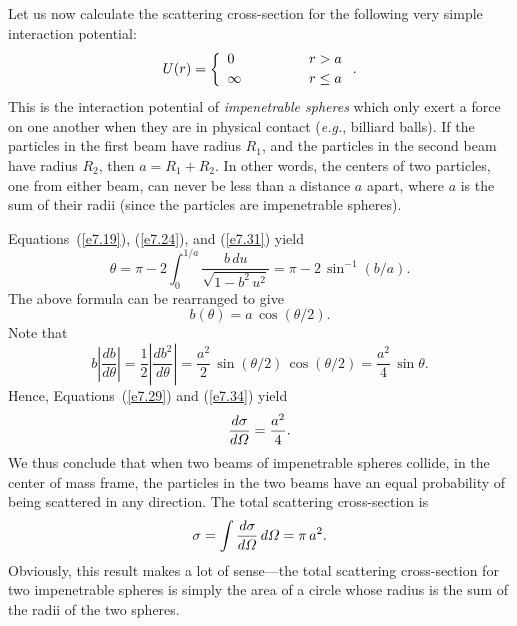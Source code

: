 Let us now calculate the scattering cross-section for the following
very simple interaction potential:
\begin{equation}
U(r) = 
\left\{\begin{array}{lll}
0&\mbox{\hspace{1cm}} & r>a\\[0.5ex]
\infty && r\leq a
\end{array}\right..\label{e7.31}
\end{equation}
This is the interaction potential of {\em impenetrable spheres}\/ which only
exert a force on one another when they are in physical contact 
({\em e.g.}, billiard balls). If the particles in the first beam have
radius $R_1$, and the particles in the second beam have radius $R_2$,
then $a=R_1+R_2$. In other words, the centers of two particles, one from either
beam, can never be less than a distance $a$ apart, where
$a$ is the sum of their radii (since the particles
are impenetrable spheres). 

Equations~(\ref{e7.19}), (\ref{e7.24}), and (\ref{e7.31})
yield
\begin{equation}
\theta = \pi - 2\int_0^{1/a}\frac{b\,du}{\sqrt{1-b^2\,u^2}} = \pi - 2\,\sin^{-1}(b/a).
\end{equation}
The above formula can be rearranged to give
\begin{equation}
b(\theta) = a\,\cos(\theta/2).
\end{equation}
Note that
\begin{equation}\label{e7.34}
b\left|\frac{db}{d\theta}\right| = \frac{1}{2}\left|\frac{d b^2}{d\theta}\right| = \frac{a^2}{2}\,\sin(\theta/2)\,\cos(\theta/2) = \frac{a^2}{4}\,\sin\theta.
\end{equation}
Hence, Equations~(\ref{e7.29}) and (\ref{e7.34}) yield
\begin{equation}\label{e7.36}
\frac{d\sigma}{d{\mit\Omega}} = \frac{a^2}{4}.
\end{equation}
We thus conclude that when two beams of impenetrable spheres
collide, in the center of mass frame, the particles in the two beams have 
an equal probability of being scattered in any direction. The total scattering
cross-section is
\begin{equation}\label{e7.37}
\sigma = \int \frac{d\sigma}{d{\mit\Omega}}\,d{\mit\Omega} = \pi\,a^2.
\end{equation}
Obviously, this result makes a lot of sense---the total scattering cross-section
for two  impenetrable spheres is simply the area of a circle
whose radius is the sum of the radii of the two spheres.

